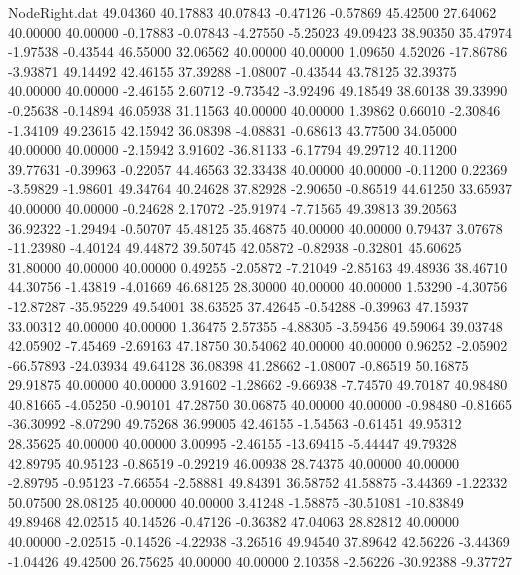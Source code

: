 \begin{filecontents}{NodeRight.dat}
  49.04360   40.17883   40.07843    -0.47126   -0.57869   45.42500   27.64062   40.00000   40.00000   -0.17883   -0.07843   -4.27550   -5.25023
  49.09423   38.90350   35.47974    -1.97538   -0.43544   46.55000   32.06562   40.00000   40.00000    1.09650    4.52026  -17.86786   -3.93871
  49.14492   42.46155   37.39288    -1.08007   -0.43544   43.78125   32.39375   40.00000   40.00000   -2.46155    2.60712   -9.73542   -3.92496
  49.18549   38.60138   39.33990    -0.25638   -0.14894   46.05938   31.11563   40.00000   40.00000    1.39862    0.66010   -2.30846   -1.34109
  49.23615   42.15942   36.08398    -4.08831   -0.68613   43.77500   34.05000   40.00000   40.00000   -2.15942    3.91602  -36.81133   -6.17794
  49.29712   40.11200   39.77631    -0.39963   -0.22057   44.46563   32.33438   40.00000   40.00000   -0.11200    0.22369   -3.59829   -1.98601
  49.34764   40.24628   37.82928    -2.90650   -0.86519   44.61250   33.65937   40.00000   40.00000   -0.24628    2.17072  -25.91974   -7.71565
  49.39813   39.20563   36.92322    -1.29494   -0.50707   45.48125   35.46875   40.00000   40.00000    0.79437    3.07678  -11.23980   -4.40124
  49.44872   39.50745   42.05872    -0.82938   -0.32801   45.60625   31.80000   40.00000   40.00000    0.49255   -2.05872   -7.21049   -2.85163
  49.48936   38.46710   44.30756    -1.43819   -4.01669   46.68125   28.30000   40.00000   40.00000    1.53290   -4.30756  -12.87287  -35.95229
  49.54001   38.63525   37.42645    -0.54288   -0.39963   47.15937   33.00312   40.00000   40.00000    1.36475    2.57355   -4.88305   -3.59456
  49.59064   39.03748   42.05902    -7.45469   -2.69163   47.18750   30.54062   40.00000   40.00000    0.96252   -2.05902  -66.57893  -24.03934
  49.64128   36.08398   41.28662    -1.08007   -0.86519   50.16875   29.91875   40.00000   40.00000    3.91602   -1.28662   -9.66938   -7.74570
  49.70187   40.98480   40.81665    -4.05250   -0.90101   47.28750   30.06875   40.00000   40.00000   -0.98480   -0.81665  -36.30992   -8.07290
  49.75268   36.99005   42.46155    -1.54563   -0.61451   49.95312   28.35625   40.00000   40.00000    3.00995   -2.46155  -13.69415   -5.44447
  49.79328   42.89795   40.95123    -0.86519   -0.29219   46.00938   28.74375   40.00000   40.00000   -2.89795   -0.95123   -7.66554   -2.58881
  49.84391   36.58752   41.58875    -3.44369   -1.22332   50.07500   28.08125   40.00000   40.00000    3.41248   -1.58875  -30.51081  -10.83849
  49.89468   42.02515   40.14526    -0.47126   -0.36382   47.04063   28.82812   40.00000   40.00000   -2.02515   -0.14526   -4.22938   -3.26516
  49.94540   37.89642   42.56226    -3.44369   -1.04426   49.42500   26.75625   40.00000   40.00000    2.10358   -2.56226  -30.92388   -9.37727

\end{filecontents}
